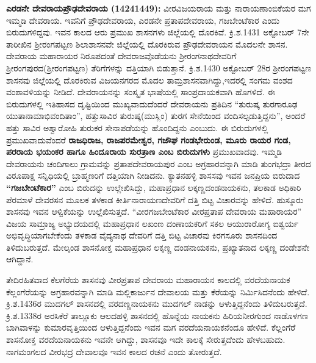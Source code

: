 \textbf{ಎರಡನೇ ದೇವರಾಯಪ್ರೌಢದೇವರಾಯ (14241449): } ವೀರವಿಜಯರಾಯ ಮತ್ತು ನಾರಾಯಣಾಂಬಿಕೆಯರ ಮಗ ಇಮ್ಮಡಿ ದೇವರಾಯ. ಇವನಿಗೆ ಪ್ರೌಢದೇವರಾಯ, ಎರಡನೇ ಪ್ರತಾಪದೇವರಾಯ, ಗಜಬೇಂಟೆಕಾರ ಎಂದು ಬಿರುದುಗಳಿದ್ದವು. ಇವನ ಕಾಲದ ಆರು ಪ್ರಮುಖ ಶಾಸನಗಳು ಜಿಲ್ಲೆಯಲ್ಲಿ ದೊರಕಿವೆ. ಕ್ರಿ.ಶ.1431 ಅಕ್ಟೋಬರ್​ 7ನೇ ತಾರೀಖಿನ ಶ‍್ರೀರಂಗಪಟ್ಟಣ ಶಿಲಾಶಾಸನವೇ ಜಿಲ್ಲೆಯಲ್ಲಿ ದೊರಕಿರುವ ಪ್ರೌಢದೇವರಾಯನ ಮೊದಲನೇ ಶಾಸನ. ದೇವರಾಯ ಮಹಾರಾಯರ ನಿರೂಪದಂತೆ ದೇವರಾಜವೊಡೆಯನು ಶ‍್ರೀರಂಗನಾಥದೇವರಿಗೆ ಶ‍್ರೀರಂಗಪುರದ(ಶ‍್ರೀರಂಗಪಟ್ಟಣ) ತೆರಿಗೆಗಳನ್ನು ದತ್ತಿಯಾಗಿ ಬಿಡುತ್ತಾನೆ. ಕ್ರಿ.ಶ.1430 ಅಕ್ಟೋಬರ್​ 28ರ ಶ‍್ರೀರಂಗಪಟ್ಟಣ ಶಾಸನವು ಜಿಲ್ಲೆಯಲ್ಲಿ ದೊರಕಿರುವ ವಿಜಯನಗರದ ಮೊದಲ ತಾಮ್ರಶಾಸನವಾಗಿದ್ದು,ಇದರಲ್ಲಿ ಸಂಗಮ ವಂಶದ ವಂಶಾವಳಿಯನ್ನು ನೀಡಿದೆ. ದೇವರಾಯನನ್ನು ಸಂಸ್ಕೃತ ಭಾಷೆಯಲ್ಲಿ ಸಾಂಪ್ರದಾಯಕವಾಗಿ ಹೊಗಳಿದೆ. ಈ ಬಿರುದುಗಳಲ್ಲಿ ಇತಿಹಾಸದ ದೃಷ್ಟಿಯಿಂದ ಮುಖ್ಯವಾದುದೆಂದರೆ ದೇವರಾಯನು ಪ್ರತಿದಿನ “ತುರುಷ್ಕ ತುರಗಾರೂಢ ಯುತಾನಾಮಾಭಿವಂದಿತಾಂ”, ಹತ್ತುಸಾವಿರ ತುರುಷ್ಕ(ಮುಸ್ಲಿಂ) ತುರಗ ಸೇನೆಯಿಂದ ವಂದಿಸಲ್ಪಡುತ್ತಿದ್ದನು”, ಅಂದರೆ ಹತ್ತು ಸಾವಿರ ಅಶ್ವಾರೋಹಿ ತುರುಕರ ಸೇನಾಪಡೆಯನ್ನು ಹೊಂದಿದ್ದನು ಎಂಬುದು. ಈ ಬಿರುದುಗಳಲ್ಲಿ ಪ್ರಮುಖವಾದುವೆಂದರೆ \textbf{ರಾಜಧಿರಾಜ, ರಾಜಪರಮೇಶ್ವರ, ಗಜೌಘ ಗಂಡಭೇರುಂಡ, ಮೂರು ರಾಯರ ಗಂಡ, ಪರರಾಯ ಭಯಂಕರ ಹಾಗೂ ಹಿಂದೂರಾಯ ಸುರತ್ರಾಣ ಎಂಬ ಬಿರುದುಗಳು} ಪ್ರಮುಖವಾದವು. ಇಮ್ಮಡಿ ದೇವರಾಯನು ಚಂದಿಗಾಲು ಗ್ರಾಮವನ್ನು ಪ್ರತಾಪದೇವರಾಯಪುರ ಎಂಬ ಅಗ್ರಹಾರವನ್ನಾಗಿ ಮಾಡಿ ತುಂಗಭದ್ರಾ ತೀರದ ವಿರೂಪಾಕ್ಷ ಸನ್ನಿಧಿಯಲ್ಲಿ ಬ್ರಾಹ್ಮಣರಿಗೆ ದತ್ತಿಯಾಗಿ ನೀಡಿದನು. ಕ್ಯಾತನಹಳ್ಳಿ ಶಾಸಸವು ಇವನ ಜನಪ್ರಿಯ ಬಿರುದಾದ \textbf{“ಗಜಬೇಂಟೆಕಾರ”} ಎಂಬ ಬಿರುದನ್ನು ಉಲ್ಲೇಖಿಸಿದ್ದು, ಮಹಾಪ್ರಧಾನ ಲಕ್ಕಣ್ಣದಂಡನಾಯಕನು, ತಲಕಾಡ ಅಧಿಕಾರಿ ಪೆರಮಾಳೆ ದೇವರಸನ ಮೂಲಕ ತಳಕಾಡ ಕೀರ್ತಿನಾರಾಯಣದೇವರಿಗೆ ದತ್ತಿ ಬಿಟ್ಟ ವಿಚಾರವನ್ನು ಹೇಳಿದೆ. ಹುಸ್ಕೂರು ಶಾಸನವು ಇವನ ಆಳ್ವಿಕೆಯನ್ನು ಉಲ್ಲೆಖಿಸುತ್ತದೆ. “ವೀರಗಜಬೇಂಟೆಕಾರ ವೀರಪ್ರತಾಪ ದೇವರಾಯ ಮಹಾರಾಯರ” ವಿಜಯ ಸಾಮ್ರಾಜ್ಯ ಅಭ್ಯುದಯದಲ್ಲಿ ಮಹಾಪ್ರಧಾನ ಲಖಂಣ ದಂಣಾಯಕರಿಗೆ ಸಕಲ ಆಯುರಾರೋಗ್ಯ ಐಶ್ವರ್ಯ ಅಭಿವೃದ್ಧಿಯಾಗಬೇಕೆಂದು ತಳಕಾಡ ವೈದ್ಯನಾಥ ದೇವರಿಗೆ ದತ್ತಿ ಬಿಟ್ಟ ವಿಚಾರವು ಕಿರಗಸೂರು ಶಾಸನದಿಂದ ತಿಳಿದುಬರುತ್ತದೆ. ಮೇಲ್ಕಂಡ ಶಾಸನೋಕ್ತ ಮಹಾಪ್ರಧಾನ ಲಕ್ಕಣ್ಣ ದಂಡನಾಯಕನು, ಪ್ರಖ್ಯಾತನಾದ ಲಕ್ಕಣ್ಣ ದಂಡೇಶನೇ ಆಗಿದ್ದಾನೆ. 

ತೇದಿರಹಿತವಾದ ಕೆಲಗೆರೆಯ ಶಾಸನವು ವೀರಪ್ರತಾಪ ದೇವರಾಯ ಮಹಾರಾಯನ ಕಾಲದಲ್ಲಿ ವರದೆಯನಾಯಕ ಕೆಲ್ಲಂಗೆರೆಯನ್ನು ಅಗ್ರಹಾರವನ್ನಾಗಿ ಮಾಡಿ ಮಲ್ಲಿಕಾರ್ಜುನ ದೇವಾಲಯ ಮತ್ತು ಕೆರೆಯನ್ನು ನಿರ್ಮಿಸಿದನೆಂದು ಹೇಳಿದೆ. ಕ್ರಿ.ಶ.1436ರ ಮುದಗಲ್​ ಶಾಸನದಲ್ಲಿ ವರದಣ್ಣನಾಯಕನು ಮುದಗಲ್​ ನಾಡನ್ನು ಆಳುತ್ತಿದ್ದನೆಂದು ತಿಳಿದುಬರುತ್ತದೆ. ಕ್ರಿ.ಶ.1338ರ ಅರಸಿಕೆರೆ ತಾಲ್ಲೂಕು ಆಲದಹಳ್ಳಿ ಶಾಸನದಲ್ಲಿ ಹೊನ್ನೆಯ ನಾಯಕನು ಹಿರಿಯನೀರಗುಂದ ನಾಡೊಳಗಣ ಬಾಗಿವಾಳನ್ನು ಕುಮಾರವೃತ್ತಿಯಿಂದ ಆಳುತ್ತಿದ್ದನೆಂದು ಇವನ ಮಗ ವರದೆಯನಾಯಕನೆಂದೂ ಹೇಳಿದೆ. ಕೆಲ್ಲಂಗೆರೆ ಶಾಸನೋಕ್ತ ವರದೆಯನಾಯಕನು ಇವನೇ ಆಗಿದ್ದು, ಶಾಸನವೂ ಇದೇ ಕಾಲಕ್ಕೆ ಸೇರುತ್ತದೆಂದು ಹೇಳಬಹುದು. ನಾಗಮಂಗಲದ ವೀರಭದ್ರ ದೇವಾಲವೂ ಇವನ ಕಾಲದ ರಚನೆ ಎಂದು ತೋರುತ್ತದೆ.

